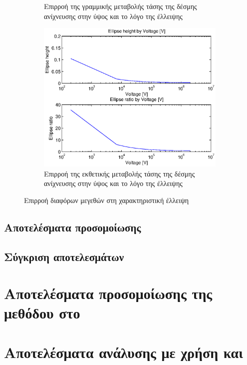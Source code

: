 \begin{figure}[tph]
\begin{subfigure}{0.47\textwidth}
		\centering
		\caption{Επιρροή της γραμμικής μεταβολής τάσης της δέσμης ανίχνευσης στην ύψος και το λόγο της έλλειψης}
		\label{fig:beam-deflection-script-06}
	\end{subfigure}
	\par\bigskip
	\begin{subfigure}{0.47\textwidth}
		\includegraphics[width=\linewidth]{figures/beam-deflection-script-07}
		\centering
		\caption{Επιρροή της εκθετικής μεταβολής τάσης της δέσμης ανίχνευσης στην ύψος και το λόγο της έλλειψης}
		\label{fig:beam-deflection-script-07}
	\end{subfigure}
\caption{Επιρροή διαφόρων μεγεθών στη χαρακτηριστική έλλειψη}
\label{fig:beam-deflectoin}
\end{figure}

\subsection{Αποτελέσματα προσομοίωσης}

\subsection{Σύγκριση αποτελεσμάτων}

\section{Αποτελέσματα προσομοίωσης της μεθόδου στο }


\section{Αποτελέσματα ανάλυσης με χρήση  και }




